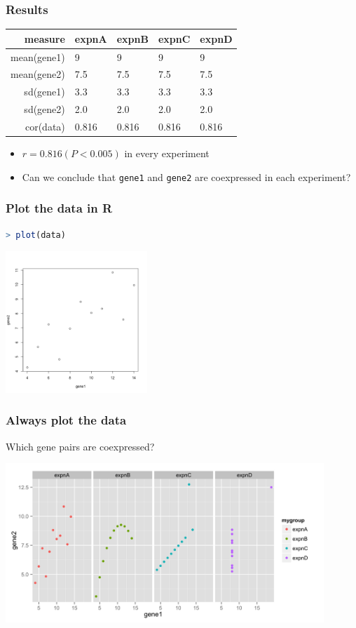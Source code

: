 \begin{frame}
  \frametitle{Results}
  \begin{center}
  \begin{tabular}{r|l|l|l|l}
	  measure & expnA & expnB & expnC & expnD \\
	  \hline
	  mean(gene1) & 9     & 9     & 9     & 9 \\
	  mean(gene2) & 7.5   & 7.5   & 7.5   & 7.5 \\
  	  sd(gene1)   & 3.3   & 3.3   & 3.3   & 3.3 \\
  	  sd(gene2)   & 2.0   & 2.0   & 2.0   & 2.0 \\  
	  cor(data)   & 0.816 & 0.816 & 0.816 & 0.816 \\  
  \end{tabular}
  \end{center}
  \begin{itemize}
     \item<2-> $r=0.816 (P<0.005)$ in every experiment
     \item<2-> Can we conclude that \texttt{gene1} and \texttt{gene2} are coexpressed in each experiment?
  \end{itemize}
\end{frame}

\begin{frame}[fragile]
  \frametitle{Plot the data in R}
\begin{lstlisting}[language=R]
> plot(data)
\end{lstlisting}
  \includegraphics[width=0.4\textwidth]{images/ex1_screenshot_d}        
\end{frame}

\begin{frame}
  \frametitle{Always plot the data}
    Which gene pairs are coexpressed?
  \begin{center}
    \includegraphics[width=0.9\textwidth]{images/ex1_rplot} \\
  \end{center}
\end{frame}

